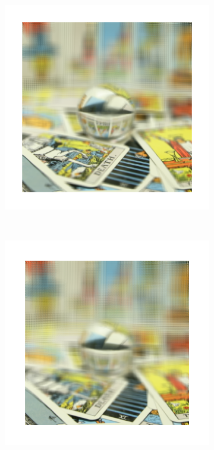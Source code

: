 \documentclass[11pt,a4paper,titlepage]{article}
\begin{document}
\begin{figure}
\begin{subfigure}[t]{0.19\textwidth}
	\end{subfigure}%
	~
	\begin{subfigure}[t]{0.19\textwidth}
		\includegraphics[width=\textwidth]{results/tarot_back_projection/sensorPlaneZ=-3/Back_Projection_layer_4.png}
	\end{subfigure}%
	~
	\begin{subfigure}[t]{0.19\textwidth}
		\includegraphics[width=\textwidth]{results/tarot_back_projection/sensorPlaneZ=-3/Back_Projection_layer_5.png}
	\end{subfigure}%
	

\end{figure}
\end{document}
